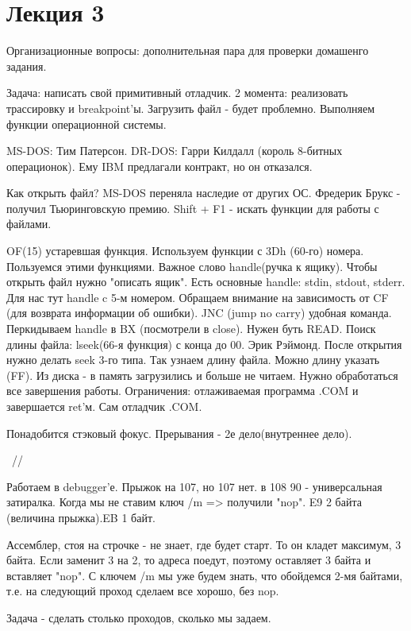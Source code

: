 \section{Лекция 3}
Организационные вопросы: дополнительная пара для проверки домашенго задания. 
\begin{hw}Задача: написать свой примитивный отладчик. 2 момента: реализовать трассировку и breakpoint'ы. Загрузить файл - будет проблемно. Выполняем функции операционной системы. 
\end{hw}
\begin{rem}
MS-DOS: Тим Патерсон.
DR-DOS: Гарри Килдалл (король 8-битных операционок). Ему IBM предлагали контракт, но он отказался.\end{rem}

Как открыть файл? MS-DOS переняла наследие от других ОС. Фредерик Брукс - получил Тьюринговскую премию. Shift + F1 - искать функции для работы с файлами. 

OF(15) устаревшая функция. Используем функции с 3Dh (60-го) номера. Пользуемся этими функциями. Важное слово handle(ручка к ящику). Чтобы открыть файл нужно "описать ящик". Есть основные handle: stdin, stdout, stderr. Для нас тут handle c 5-м номером. Обращаем внимание на зависимость от CF (для возврата информации об ошибки). JNC (jump no carry) удобная команда. Перкидываем handle в BX (посмотрели в close). Нужен буть READ. Поиск длины файла: lseek(66-я функция) с конца до 00. Эрик Рэймонд. После открытия нужно делать seek 3-го типа. Так узнаем длину файла. Можно длину указать (FF). Из диска - в память загрузились и больше не читаем. Нужно обработаться все завершения работы.
Ограничения: отлаживаемая программа .COM и завершается ret'м. Сам отладчик .COM.

Понадобится стэковый фокус. Прерывания - 2е дело(внутреннее дело). 

~//

Работаем в debugger'е.
Прыжок на 107, но 107 нет. в 108
90 - универсальная затиралка. Когда мы не ставим ключ /m => получили "nop".
E9 2 байта (величина прыжка).EB 1 байт.

Ассемблер, стоя на строчке - не знает, где будет старт. То он кладет максимум, 3 байта. Если заменит 3 на 2, то адреса поедут, поэтому оставляет 3 байта и вставляет "nop". С ключем /m мы уже будем знать, что обойдемся 2-мя байтами, т.е. на следующий проход сделаем все хорошо, без nop.

\begin{hw} Задача - сделать столько проходов, сколько мы задаем.\end{hw}

